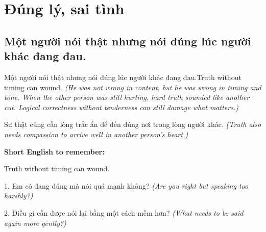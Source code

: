 \chapter{Đúng lý, sai tình}

\section{Một người nói thật nhưng nói đúng lúc người khác đang đau.}
\begin{truyen}{Một người nói thật nhưng nói đúng lúc người khác đang đau.}{Truth without timing can wound.}
\textit{(He was not wrong in content, but he was wrong in timing and tone. When the other person was still hurting, hard truth sounded like another cut. Logical correctness without tenderness can still damage what matters.)}
\end{truyen}
\begin{baihoc}
Sự thật cũng cần lòng trắc ẩn để đến đúng nơi trong lòng người khác.
\textit{(Truth also needs compassion to arrive well in another person's heart.)}
\end{baihoc}
\begin{ghinhoanh}\textbf{Short English to remember:}

Truth without timing can wound.
\end{ghinhoanh}
\begin{tuhocnhanh}
1. Em có đang đúng mà nói quá mạnh không? \textit{(Are you right but speaking too harshly?)}

2. Điều gì cần được nói lại bằng một cách mềm hơn? \textit{(What needs to be said again more gently?)}
\end{tuhocnhanh}
\ngancach

